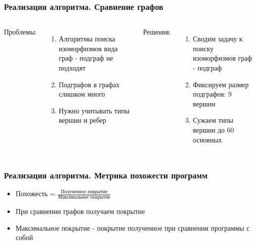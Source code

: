 \documentclass[10pt]{beamer}
\begin{document}
\begin{frame}\frametitle{Реализация алгоритма. Сравнение графов}
	\begin{columns}[T]
	    Проблемы:
		\begin{enumerate}
		\item Алгоритмы поиска изоморфизмов вида граф - подграф не
		подходят
		\item Подграфов в графах слишком много
		\item Нужно учитывать типы вершин и ребер
		\end{enumerate}
	
	
	Решения:
	\begin{enumerate}
	\item Сводим задачу к поиску изоморфизмов граф - подграф \newline
	\item Фиксируем размер подграфов: 9 вершин
	\item Сужаем типы вершин до 60 основных
	\end{enumerate}
	\end{columns}
\end{frame}

\begin{frame}\frametitle{Реализация алгоритма. Метрика похожести программ}
	\begin{itemize}
		\item Похожесть = $\frac{\text{Полученное покрытие}}{\text{Максимальное покрытие}}$
		\item При сравнении графов получаем покрытие
		\item Максимальное покрытие - покрытие полученное при сравнении программы с собой
	\end{itemize}
	
\end{frame}
\end{document}
